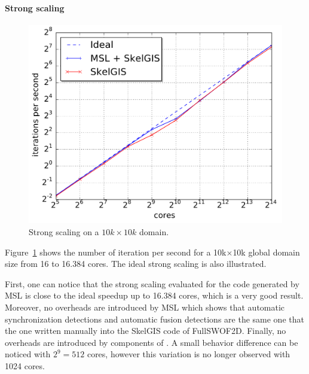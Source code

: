 \paragraph{\textbf{Strong scaling}}
\begin{figure}[t]\begin{center}
  \includegraphics[width=.6\textwidth]{../IJPP/results/strong_scaling/10K_1K/median_strong.pdf}
  \caption{Strong scaling on a $10k \times 10k$ domain.}
  \label{fig:strong}
\end{center}\end{figure}
Figure~\ref{fig:strong} shows the number of iteration per second for a 10k$\times$10k global domain size from 16 to 16.384 cores.
The ideal strong scaling is also illustrated.

First, one can notice that the strong scaling evaluated for the code generated by MSL is close to the ideal speedup up to 16.384 cores, which is a very good result. Moreover, no overheads are introduced by MSL which shows that automatic synchronization detections and automatic fusion detections are the same one that the one written manually into the SkelGIS code of FullSWOF2D. Finally, no overheads are introduced by components of \llc. A small behavior difference can be noticed with $2^9=512$ cores, however this variation is no longer observed with 1024 cores.

